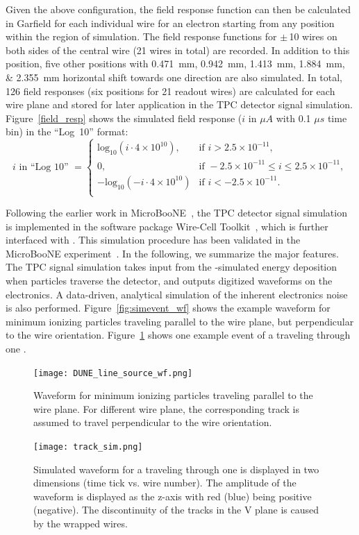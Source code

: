  Given the above configuration, the field response function can then be calculated in Garfield
  for each individual wire  for an
  electron starting from any position within the region of simulation. 
  The field response functions for $\pm\,$10 wires on both sides of the central wire (21 wires in total) are 
  recorded. In addition to this position, five other positions with
  \SIlist{0.471;0.942;1.413;1.884;2.355}{\mm} horizontal shift towards one direction are also simulated.
  In total, 126 field responses (six positions for 21 readout wires) are calculated for each wire plane and stored for later
  application in the TPC detector signal simulation.
  Figure~\ref{field_resp} shows the simulated field response ($i$ in $\mu A$ with 0.1 $\mu s$ time bin) 
   in the ``Log~10'' format:
   \begin{equation}\label{eq:log10}
    i \text{ in ``Log 10'' } =
    \begin{cases}
      \text{log}_{10}(i\cdot4\times10^{10}),& \text{if }i>2.5\times10^{-11},\\
      0,& \text{if }  -2.5 \times10^{-11} \leq i \leq 2.5 \times 10^{-11},\\
      -\text{log}_{10}(- i\cdot4\times10^{10})& \text{if }i<-2.5\times10^{-11}.\\
      \end{cases}
  \end{equation}
  
  Following the earlier work in MicroBooNE~\cite{Adams:2018dra}, the TPC detector signal simulation
  is implemented in the software package Wire-Cell Toolkit~\cite{ref:wire_cell_toolkit,ref:full_simulation}, which is 
  further interfaced with . This simulation procedure has been validated in the MicroBooNE experiment~\cite{Adams:2018gbi}. In
  the following, we summarize the major features. The TPC signal simulation takes input from the -simulated energy deposition when particles traverse the detector, and outputs digitized waveforms on the  electronics.
   A data-driven, analytical simulation of the inherent electronics noise is also performed. 
Figure~\ref{fig:simevent_wf} shows the example waveform for minimum ionizing particles traveling parallel to 
the wire plane, but perpendicular to the wire orientation.  Figure~\ref{fig:simevent} shows one example event of 
a  traveling through one . 

\begin{figure}[htbp]
  \centering
        \texttt{[image: DUNE\_line\_source\_wf.png]}
        \caption{Waveform for minimum ionizing particles traveling parallel to the wire plane. For different
        wire plane, the corresponding track is assumed to travel perpendicular to the wire orientation. 
        }\label{fig:simevent_wf}
         \texttt{[image: track\_sim.png]}
    \caption{Simulated waveform for a  traveling through one  is displayed in two dimensions (time tick vs. wire number). The amplitude of the waveform is displayed as the z-axis with red (blue) being positive (negative). The discontinuity of the 
    tracks in the V plane is caused by the wrapped wires.}
  \label{fig:simevent}
\end{figure}

